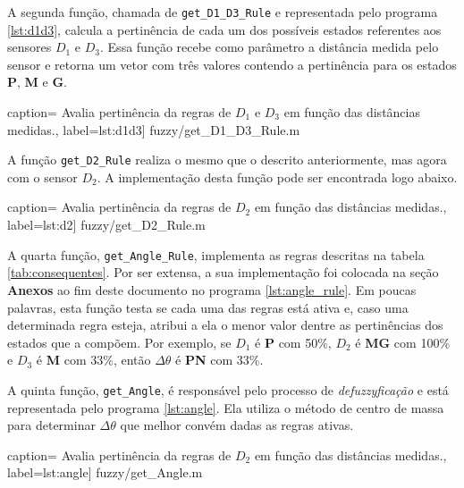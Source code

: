 	\vspace{12pt}
	
	A segunda função, chamada de \texttt{get\_D1\_D3\_Rule} e representada pelo
	programa \ref{lst:d1d3}, calcula a pertinência de cada um dos possíveis estados
	referentes aos sensores \(D_1\) e \(D_3\).	Essa função recebe como parâmetro a
	distância medida pelo sensor e retorna um vetor com três valores contendo a
	pertinência para os estados \textbf{P}, \textbf{M} e \textbf{G}. 
	
	 caption={
	Avalia pertinência da regras de \(D_1\) e \(D_3\) em função das distâncias
	medidas.}, label={lst:d1d3}] {fuzzy/get_D1_D3_Rule.m}

	\vspace{12pt}
	
	A função \texttt{get\_D2\_Rule} realiza o mesmo que o descrito anteriormente,
	mas agora com o sensor \(D_2\). A implementação desta função pode ser
	encontrada logo abaixo.
	
	 caption={
	Avalia pertinência da regras de \(D_2\) em função das distâncias
	medidas.}, label={lst:d2}] {fuzzy/get_D2_Rule.m} 
	
	\vspace{12pt}
	
	A quarta função, \texttt{get\_Angle\_Rule}, implementa as regras descritas na
	tabela \ref{tab:consequentes}. Por ser extensa, a sua implementação foi
	colocada na seção \textbf{Anexos} ao fim deste documento no programa
	\ref{lst:angle_rule}. Em poucas palavras, esta função testa se cada uma das
	regras está ativa e, caso uma determinada regra esteja, atribui a ela o menor
	valor dentre as pertinências dos estados que a compõem. Por exemplo, se \(D_1\)
	é \textbf{P} com 50\%, \(D_2\) é \textbf{MG} com 100\% e \(D_3\) é \textbf{M}
	com 33\%, então \(\Delta \theta\) é \textbf{PN} com 33\%.
	
	\vspace{12pt}
	
	A quinta função, \texttt{get\_Angle}, é responsável pelo processo de
	\textit{defuzzyficação} e está representada pelo programa \ref{lst:angle}. Ela
	utiliza o método de centro de massa para determinar \(\Delta \theta\) que
	melhor convém dadas as regras ativas.
	
	 caption={
	Avalia pertinência da regras de \(D_2\) em função das distâncias
	medidas.}, label={lst:angle}] {fuzzy/get_Angle.m} 
